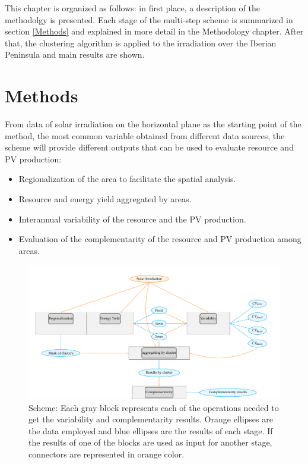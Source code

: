 This chapter is organized as follows: in first place, a description of the methodolgy is presented. Each stage of the multi-step scheme is summarized in section \ref{Methods} and explained in more detail in the Methodology chapter. After that, the clustering algorithm is applied to the irradiation over the Iberian Peninsula and main results are shown.\\

\section{Methods}


From data of solar irradiation on the horizontal plane as the starting point of the method, the most common variable obtained from different data sources, the scheme will provide different outputs that can be used to evaluate resource and PV production:\\

\begin{itemize}
\item Regionalization of the area to facilitate the spatial analysis.
\item Resource and energy yield aggregated by areas.
\item Interannual variability of the resource and the PV production.
\item Evaluation of the complementarity of the resource and PV production among areas.
\end{itemize}  
 
\begin{figure}[h!]
\centering\includegraphics[width=1\textwidth]{figs/capitulo5/multi_step}
\caption{Scheme: Each gray block represents each of the operations needed to get the variability and complementarity results. Orange ellipses are the data employed and blue ellipses are the results of each stage. If the results of one of the blocks are used as input for another stage, connectors are represented in orange color.}
\label{fig:multi_step}
\end{figure}

